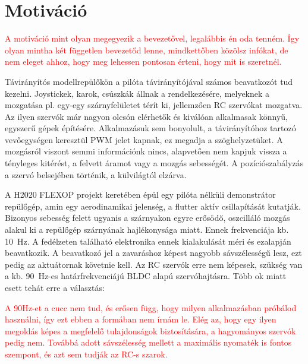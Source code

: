 \section{Motiváció}


\begin{scriptsize}
\textcolor{red}{
A motiváció mint olyan megegyezik a bevezetővel, legalábbis én oda tenném. Így olyan mintha két független bevezetőd lenne, mindkettőben közölsz infókat, de nem eleget ahhoz, hogy meg lehessen pontosan érteni, hogy mit is szeretnél.
}
\end{scriptsize}


Távirányítós modellrepülőkön a pilóta távirányítójával számos beavatkozót tud kezelni. Joystickek, karok, csúszkák állnak a rendelkezésére, melyeknek a mozgatása pl. egy-egy szárnyfelületet térít ki, jellemzően RC szervókat mozgatva.
Az ilyen szervók már nagyon olcsón elérhetők és kiválóan alkalmasak könnyű, egyszerű gépek építésére.
Alkalmazásuk sem bonyolult, a távirányítóhoz tartozó vevőegységen keresztül PWM jelet kapnak, ez megadja a szöghelyzetüket. A mozgásról viszont semmi információnk nincs, alapvetően nem kapjuk vissza a tényleges kitérést, a felvett áramot vagy a mozgás sebességét. A pozíciószabályzás a szervó belsejében történik, a külvilágtól elzárva.

\vspace{10pt}

A H2020 FLEXOP projekt keretében épül egy pilóta nélküli demonstrátor repülőgép, amin egy aerodinamikai jelenség, a flutter aktív csillapítását kutatják. Bizonyos sebesség felett ugyanis a szárnyakon egyre erősödő, oszcilláló mozgás alakul ki a repülőgép szárnyának hajlékonysága miatt. Ennek frekvenciája kb. \SI{10}{\hertz}. A fedélzeten található elektronika ennek kialakulását méri és ezalapján beavatkozik. A beavatkozó jel a zavaráshoz képest nagyobb sávszélességű lesz, ezt pedig az aktuátornak követnie kell. Az RC szervók erre nem képesek, szükség van a kb. \SI{90}{\hertz}-es határfrekvenciájú BLDC alapú szervóhajtásra. Több ok miatt esett tehát erre a választás:


\begin{scriptsize}
\textcolor{red}{
    A 90Hz-et a cucc nem tud, és erősen függ, hogy milyen alkalmazásban próbálod használni, így ezt ebben a formában nem írnám le. Elég az, hogy egy ilyen megoldás képes a megfelelő tulajdonságok biztosítására, a hagyományos szervók pedig nem.
    Továbbá adott sávszélesség mellett a maximális nyomaték is fontos szempont, és azt sem tudják az RC-s szarok.
}
\end{scriptsize}



